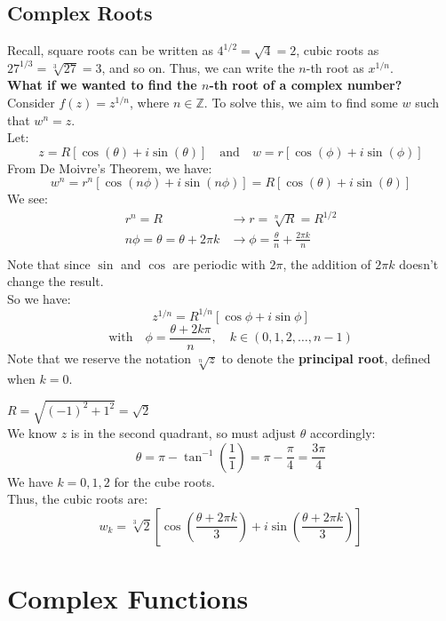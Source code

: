 \documentclass[a4paper,12pt]{article} %
\theoremstyle{definition}
\theoremstyle{plain}
\begin{document}
\subsection{Complex Roots}
Recall, square roots can be written as $4^{1/2} = \sqrt{4} = 2$, cubic roots as $27^{1/3} = \sqrt[3]{27} = 3$, and so on. Thus, we can write the $n$-th root as $x^{1/n}$. \\
\textbf{What if we wanted to find the $n$-th root of a complex number?} \\
Consider $f(z) = z^{1/n}$, where $n\in \mathbb{Z}$. To solve this, we aim to find some $w$ such that $w^n = z$. \\
Let:
$$z = R[\cos(\theta) + i \sin( \theta)] \quad \text{and} \quad w = r[\cos(\phi) + i \sin(\phi)]$$
From De Moivre's Theorem, we have:
$$w^n = r^n[\cos(n\phi) + i\sin(n\phi)] = R[\cos(\theta) + i\sin(\theta)]$$
We see:
\begin{align*}
  r^n = R &\rightarrow r = \sqrt[n]{R} = R^{1/2} \\
  n\phi = \theta = \theta + 2\pi k &\rightarrow \phi = \frac{\theta}{n} + \frac{2\pi k}{n}\\
\end{align*}
Note that since $\sin$ and $\cos$ are periodic with $2\pi$, the addition of $2\pi k$ doesn't change the result.\\
So we have:
$$z^{1/n} = R^{1/n} [\cos\phi + i \sin\phi]$$
$$\text{with} \quad \phi = \frac{\theta+ 2k\pi}{n}, \quad k \in (0, 1, 2, \dots, n-1)$$
Note that we reserve the notation $\sqrt[n]{z}$ to denote the \textbf{principal root}, defined when $k = 0$.

\begin{examplebox}[Find the cube roots of $z = -1 + i$]
  $R = \sqrt{(-1)^2 + 1^2} = \sqrt{2}$ \\
  We know $z$ is in the second quadrant, so must adjust $\theta$ accordingly: 
  $$\theta = \pi - \tan^{-1}\left(\frac{1}{1}\right) = \pi - \frac{\pi}{4} = \frac{3\pi}{4}$$ 
  We have $k = 0,1,2$ for the cube roots. \\
  Thus, the cubic roots are:
  $$w_k = \sqrt[3]{2} \left[\cos\left(\frac{\theta + 2\pi k}{3}\right) + i\sin\left(\frac{\theta + 2\pi k}{3}\right)\right]$$
\end{examplebox}
\pagebreak
\section{Complex Functions}
\end{document}
